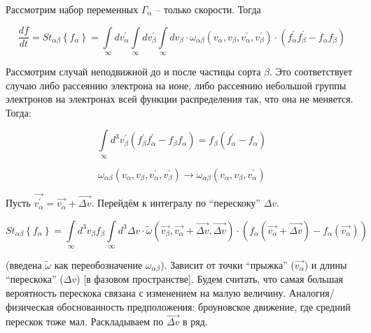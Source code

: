 \documentclass[10pt, a4paper]{article}
\begin{document}
Рассмотрим набор переменных $\Gamma_\alpha$ -- только скорости. Тогда

\begin{equation*}
	\frac{df}{dt} = St_{\alpha\beta}\left\lbrace f_\alpha\right\rbrace = \int\limits_{\infty}dv_\alpha^{'} \int\limits_{\infty}dv_\beta^{'} \int\limits_{\infty}dv_\beta \cdot \omega_{\alpha\beta}\left(v_\alpha, v_\beta, v_\alpha^{'}, v_\beta^{'}\right) \cdot (f_{\alpha}^{'}f_{\beta}^{'}-f_{\alpha}f_{\beta})
\end{equation*}

Рассмотрим случай неподвижной до и после частицы сорта $\beta$. Это соответствует случаю либо рассеянию электрона на ионе, либо рассеянию небольшой группы электронов на электронах всей функции распределения так, что она не меняется. Тогда:

\begin{equation*}
	\int\limits_{\infty} d^3v_\beta^{'}\left(f_\beta^{'}f_\alpha^{'}-f_\beta f_\alpha\right) = f_\beta\left(f_\alpha^{'}-f_\alpha\right)
\end{equation*}

\begin{equation*}
	\omega_{\alpha\beta}\left(v_\alpha, v_\beta, v_\alpha^{'}, v_\beta^{'}\right) \rightarrow \omega_{\alpha\beta}\left(v_\alpha, v_\beta, v_\alpha^{'}\right)
\end{equation*}

Пусть $\overrightarrow{v_\alpha^{'}}=\overrightarrow{v_\alpha}+\overrightarrow{\Delta v}$. Перейдём к интегралу по ``перескоку'' $\Delta v$.

\begin{equation*}
	St_{\alpha\beta}\left\lbrace f_\alpha\right\rbrace = \int\limits_{\infty}d^3v_\beta f_\beta \int\limits_{\infty} d^3\Delta v \cdot \widetilde{\omega}(\overrightarrow{v_\beta}, \overrightarrow{v_\alpha}+\overrightarrow{\Delta v}, \overrightarrow{\Delta v}) \cdot \left(f_\alpha\left(\overrightarrow{v_\alpha}+\overrightarrow{\Delta v}\right)-f_\alpha\left(\overrightarrow{v_\alpha}\right)\right)
\end{equation*}

(введена $\widetilde{\omega}$ как переобозначение $\omega_{\alpha\beta}$). Зависит от точки ``прыжка'' ($\overrightarrow{v_\alpha}$) и длины ``перескока'' ($\Delta v$) [в фазовом пространстве]. Будем считать, что самая большая вероятность перескока связана с изменением на малую величину. Аналогия/физическая обоснованность предположения: броуновское движение, где средний перескок тоже мал. Раскладываем по $\overrightarrow{\Delta v}$ в ряд.
\end{document}
